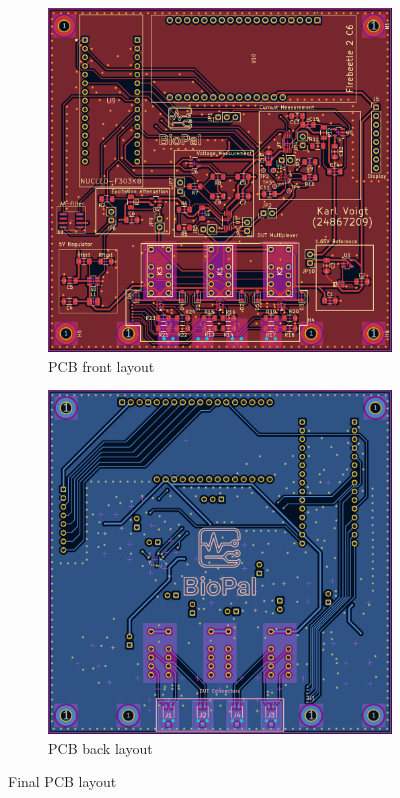 \begin{figure}[H]
    \centering
    \begin{subfigure}[b]{0.48\textwidth}
        \centering
        \includegraphics[width=\textwidth]{BioPal_Front.png}
        \caption{PCB front layout}
        \label{fig:pcb_front}
    \end{subfigure}\hfill
    \begin{subfigure}[b]{0.48\textwidth}
        \centering
        \includegraphics[width=\textwidth]{BioPal_Back.png}
        \caption{PCB back layout}
        \label{fig:pcb_back}
    \end{subfigure}
    \caption{Final PCB layout}
    \label{fig:pcb_layout}
\end{figure}

